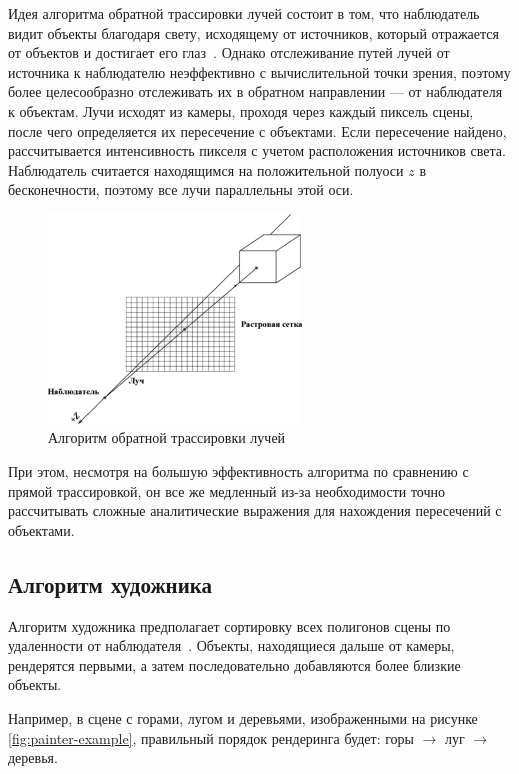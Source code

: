 Идея алгоритма обратной трассировки лучей состоит в том, что наблюдатель видит объекты благодаря свету, исходящему от источников, который отражается от объектов и достигает его глаз~\cite{lit5}. Однако отслеживание путей лучей от источника к наблюдателю неэффективно с вычислительной точки зрения, поэтому более целесообразно отслеживать их в обратном направлении — от наблюдателя к объектам. Лучи исходят из камеры, проходя через каждый пиксель сцены, после чего определяется их пересечение с объектами. Если пересечение найдено, рассчитывается интенсивность пикселя с учетом расположения источников света. Наблюдатель считается находящимся на положительной полуоси $z$ в бесконечности, поэтому все лучи параллельны этой оси. 

\begin{figure}[h] 
	\centering
	\includegraphics[width=0.6\textwidth]{images/reverse-ray-tracing.png}
	\caption{Алгоритм обратной трассировки лучей} 
	\label{fig:reverse-ray-tracing} 
\end{figure}

При этом, несмотря на большую эффективность алгоритма по сравнению с прямой трассировкой, он все же медленный из-за необходимости точно рассчитывать сложные аналитические выражения для нахождения пересечений с объектами.

\subsection{Алгоритм художника}

Алгоритм художника предполагает сортировку всех полигонов сцены по удаленности от наблюдателя~\cite{lit6}. Объекты, находящиеся дальше от камеры, рендерятся первыми, а затем последовательно добавляются более близкие объекты. 

Например, в сцене с горами, лугом и деревьями, изображенными на рисунке \ref{fig:painter-example}, правильный порядок рендеринга будет: горы $\rightarrow$ луг $\rightarrow$ деревья.

